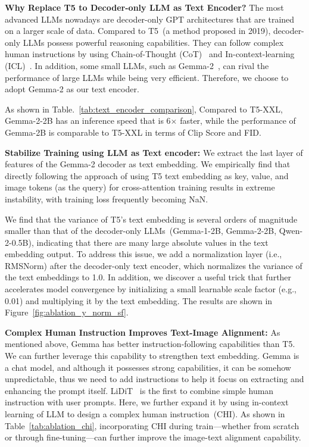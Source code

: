 \noindent \textbf{Why Replace T5 to Decoder-only LLM as Text Encoder? }
The most advanced LLMs nowadays are decoder-only GPT architectures that are trained on a larger scale of data. Compared to T5~(a method proposed in 2019), decoder-only LLMs possess powerful reasoning capabilities. They can follow complex human instructions by using Chain-of-Thought (CoT)~\citep{wei2022chain} and In-context-learning (ICL)~\citep{brown2020language}. 
In addition, some small LLMs, such as Gemma-2~\citep{team2024gemma2}, can rival the performance of large LLMs while being very efficient. Therefore, we choose to adopt Gemma-2 as our text encoder.

As shown in Table.~\ref{tab:text_encoder_comparison}, 
Compared to T5-XXL, Gemma-2-2B has an inference speed that is 6$\times$ faster, while the performance of Gemma-2B is comparable to T5-XXL in terms of Clip Score and FID.


\noindent \textbf{Stabilize Training using LLM as Text encoder:} We extract the last layer of features of the Gemma-2 decoder as text embedding. We empirically find that directly following the approach of using T5 text embedding as key, value, and image tokens (as the query) for cross-attention training results in extreme instability, with training loss frequently becoming NaN.

We find that the variance of T5's text embedding is several orders of magnitude smaller than that of the decoder-only LLMs~(Gemma-1-2B, Gemma-2-2B, Qwen-2-0.5B), indicating that there are many large absolute values in the text embedding output. To address this issue, we add a normalization layer (i.e., RMSNorm) after the decoder-only text encoder, which normalizes the variance of the text embeddings to 1.0. In addition, we discover a useful trick that further accelerates model convergence by initializing a small learnable scale factor (e.g., 0.01) and multiplying it by the text embedding. The results are shown in Figure~\ref{fig:ablation_y_norm_sf}.






\noindent \textbf{Complex Human Instruction Improves Text-Image Alignment:} As mentioned above, Gemma has better instruction-following capabilities than T5. We can further leverage this capability to strengthen text embedding. Gemma is a chat model, and although it possesses strong capabilities, it can be somehow unpredictable, thus we need to add instructions to help it focus on extracting and enhancing the prompt itself.
LiDiT~\citep{ma2024exploring} is the first to combine simple human instruction with user prompts. Here, we further expand it by using in-context learning of LLM to design a complex human instruction~(CHI). As shown in Table~\ref{tab:ablation_chi}, incorporating CHI during train—whether from scratch or through fine-tuning—can further improve the image-text alignment capability. 

